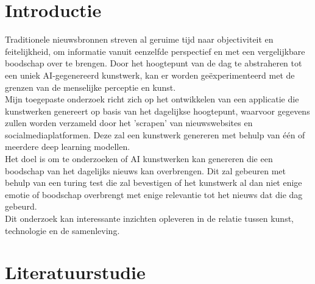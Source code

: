 
\section{Introductie}%
\label{sec:introductie}
\noindent
Traditionele nieuwsbronnen streven al geruime tijd naar objectiviteit en feitelijkheid, om informatie vanuit eenzelfde perspectief en met een vergelijkbare boodschap over te brengen. Door het hoogtepunt van de dag te abstraheren tot een uniek AI-gegenereerd kunstwerk, kan er worden geëxperimenteerd met de grenzen van de menselijke perceptie en kunst. \\
\noindent
Mijn toegepaste onderzoek richt zich op het ontwikkelen van een applicatie die kunstwerken genereert op basis van het dagelijkse hoogtepunt, waarvoor gegevens zullen worden verzameld door het 'scrapen' van nieuwswebsites en socialmediaplatformen.
Deze zal een kunstwerk genereren met behulp van één of meerdere deep learning modellen. \\
\noindent
Het doel is om te onderzoeken of AI kunstwerken kan genereren die een boodschap van het dagelijks nieuws kan overbrengen. Dit zal gebeuren met behulp van een turing test die zal bevestigen of het kunstwerk al dan niet enige emotie of boodschap overbrengt met enige relevantie tot het nieuws dat die dag gebeurd.\\
\noindent
Dit onderzoek kan interessante inzichten opleveren in de relatie tussen kunst, technologie en de samenleving.


\section{Literatuurstudie}%
